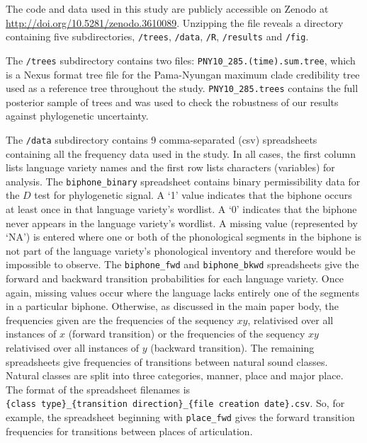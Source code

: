 The code and data used in this study are publicly accessible on Zenodo
at \url{http://doi.org/10.5281/zenodo.3610089}. Unzipping the file
reveals a directory containing five subdirectories, \texttt{/trees},
\texttt{/data}, \texttt{/R}, \texttt{/results} and \texttt{/fig}.

The \texttt{/trees} subdirectory contains two files:
\texttt{PNY10\_285.(time).sum.tree}, which is a Nexus format tree file
for the Pama-Nyungan maximum clade credibility tree used as a reference
tree throughout the study. \texttt{PNY10\_285.trees} contains the full
posterior sample of trees and was used to check the robustness of our
results against phylogenetic uncertainty.

The \texttt{/data} subdirectory contains 9 comma-separated (csv)
spreadsheets containing all the frequency data used in the study. In all
cases, the first column lists language variety names and the first row
lists characters (variables) for analysis. The \texttt{biphone\_binary}
spreadsheet contains binary permissibility data for the \(D\) test for
phylogenetic signal. A `1' value indicates that the biphone occurs at
least once in that language variety's wordlist. A `0' indicates that the
biphone never appears in the language variety's wordlist. A missing
value (represented by `NA') is entered where one or both of the
phonological segments in the biphone is not part of the language
variety's phonological inventory and therefore would be impossible to
observe. The \texttt{biphone\_fwd} and \texttt{biphone\_bkwd}
spreadsheets give the forward and backward transition probabilities for
each language variety. Once again, missing values occur where the
language lacks entirely one of the segments in a particular biphone.
Otherwise, as discussed in the main paper body, the frequencies given
are the frequencies of the sequency \(xy\), relativised over all
instances of \(x\) (forward transition) or the frequencies of the
sequency \(xy\) relativised over all instances of \(y\) (backward
transition). The remaining spreadsheets give frequencies of transitions
between natural sound classes. Natural classes are split into three
categories, manner, place and major place. The format of the spreadsheet
filenames is
\texttt{\{class\ type\}\_\{transition\ direction\}\_\{file\ creation\ date\}.csv}.
So, for example, the spreadsheet beginning with \texttt{place\_fwd}
gives the forward transition frequencies for transitions between places
of articulation.

